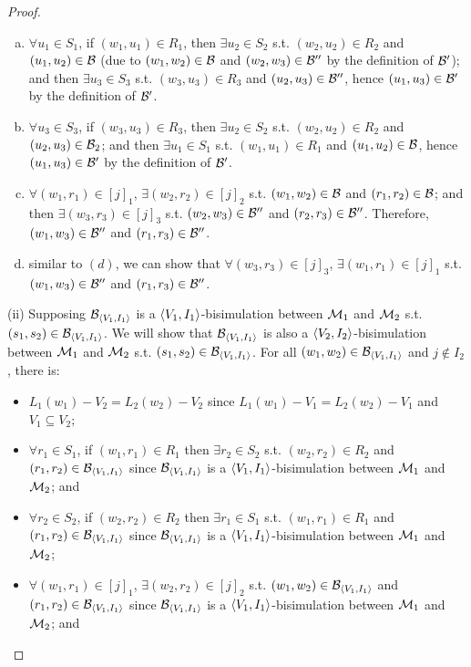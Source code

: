 \documentclass[twoside,11pt]{article}
\begin{document}
\begin{proof}
\begin{enumerate}[(a)]
			\item $\forall u_1\in S_1$, if $(w_1, u_1) \in R_1$, then $\exists u_2\in S_2$ s.t.  $(w_2, u_2) \in R_2$ and $(u_1,u_2)\in {\cal B}$ (due to $(w_1,w_2)\in {\cal B}$ and $(w_2, w_3) \in {\cal B}''$ by the definition of ${\cal B}'$); and then $\exists u_3 \in S_3$ s.t.  $(w_3, u_3) \in R_3$ and $(u_2, u_3) \in {\cal B}''$, hence $(u_1, u_3) \in {\cal B}'$ by the definition of ${\cal B}'$.
			
			\item $\forall u_3\in S_3$, if $(w_3, u_3) \in R_3$, then $\exists u_2\in S_2$ s.t.  $(w_2, u_2) \in R_2$ and $(u_2, u_3) \in {\cal B}_2$; and then $\exists u_1 \in S_1$ s.t.  $(w_1, u_1) \in R_1$ and $(u_1, u_2) \in {\cal B}$, hence $(u_1, u_3) \in {\cal B}'$ by the definition of ${\cal B}'$.
			
			\item $\forall (w_1, r_1) \in [j]_1$, $\exists (w_2, r_2) \in [j]_2$ s.t. $(w_1, w_2)\in {\cal B}$ and $(r_1, r_2) \in {\cal B}$; and then $\exists (w_3, r_3)\in [j]_3$ s.t. $(w_2, w_3)\in {\cal B}''$ and $(r_2, r_3) \in {\cal B}''$. Therefore, $(w_1, w_3) \in {\cal B}''$ and $(r_1, r_3) \in {\cal B}''$.
			
			\item similar to $(d)$, we can show that $\forall (w_3, r_3)\in [j]_3$, $\exists(w_1, r_1)\in [j]_1$ s.t. $(w_1, w_3) \in {\cal B}''$ and $(r_1, r_3) \in {\cal B}''$.
		\end{enumerate}
		
		(ii) Supposing ${\cal B}_{\langle{V_1, I_1}\rangle}$ is a ${\langle{V_1,I_1}\rangle}$-bisimulation between ${\cal M}_1$ and ${\cal M}_2$ s.t. $(s_1, s_2)\in {\cal B}_{\langle{V_1, I_1}\rangle}$. We will show that ${\cal B}_{\langle{V_1, I_1}\rangle}$ is also a ${\langle{V_2, I_2}\rangle}$-bisimulation between ${\cal M}_1$ and ${\cal M}_2$ s.t. $(s_1, s_2)\in {\cal B}_{\langle{V_1, I_1}\rangle}$.
		For all $(w_1, w_2) \in {\cal B}_{\langle{V_1, I_1}\rangle}$ and $j\not \in I_2$, there is:
		\begin{itemize}
			\item $L_1(w_1) - V_2 = L_2(w_2) -V_2$ since $L_1(w_1) - V_1 = L_2(w_2) -V_1$ and $V_1 \subseteq V_2$;
			\item $\forall r_1 \in S_1$, if $(w_1,r_1) \in R_1$ then $\exists r_2\in S_2$ s.t. $(w_2,r_2)\in R_2$ and $(r_1,r_2) \in {\cal B}_{\langle{V_1, I_1}\rangle}$ since ${\cal B}_{\langle{V_1, I_1}\rangle}$ is a ${\langle{V_1, I_1}\rangle}$-bisimulation between ${\cal M}_1$ and ${\cal M}_2$; and
			\item $\forall r_2 \in S_2$, if $(w_2,r_2) \in R_2$ then $\exists r_1\in S_1$ s.t. $(w_1,r_1)\in R_1$ and $(r_1,r_2) \in {\cal B}_{\langle{V_1, I_1}\rangle}$ since ${\cal B}_{\langle{V_1, I_1}\rangle}$ is a ${\langle{V_1, I_1}\rangle}$-bisimulation between ${\cal M}_1$ and ${\cal M}_2$;
			\item $\forall (w_1, r_1) \in [j]_1$, $\exists (w_2, r_2) \in [j]_2$ s.t. $(w_1, w_2)\in {\cal B}_{\langle{V_1, I_1}\rangle}$ and $(r_1, r_2) \in {\cal B}_{\langle{V_1, I_1}\rangle}$ since ${\cal B}_{\langle{V_1, I_1}\rangle}$ is a ${\langle{V_1, I_1}\rangle}$-bisimulation between ${\cal M}_1$ and ${\cal M}_2$;  and
			

\end{itemize}
\end{proof}
\end{document}
